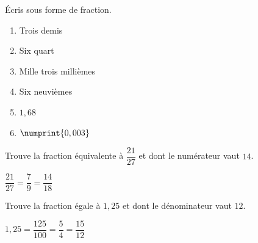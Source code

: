 \documentclass[../math2.tex]{subfiles}
\begin{document}
\begin{exercise}
  Écris sous forme de fraction.
  \begin{enumerate}[cols=3]
    \item Trois demis
    \item Six quart
    \item Mille trois millièmes
    \item Six neuvièmes
    \item $1,68$
    \item $\numprint{0,003}$
  \end{enumerate}
\end{exercise}

\begin{exercise}
  Trouve la fraction équivalente à $\dfrac{21}{27}$ et dont le numérateur vaut $14$.
\end{exercise}
\begin{solution}
  $\dfrac{21}{27} = \dfrac{7}{9} = \dfrac{14}{18}$ 
\end{solution}

\begin{exercise}
  Trouve la fraction égale à $1,25$ et dont le dénominateur vaut $12$.
\end{exercise}
\begin{solution}
  $1,25=\dfrac{125}{100}=\dfrac{5}{4}=\dfrac{15}{12}$
\end{solution}
\end{document}
